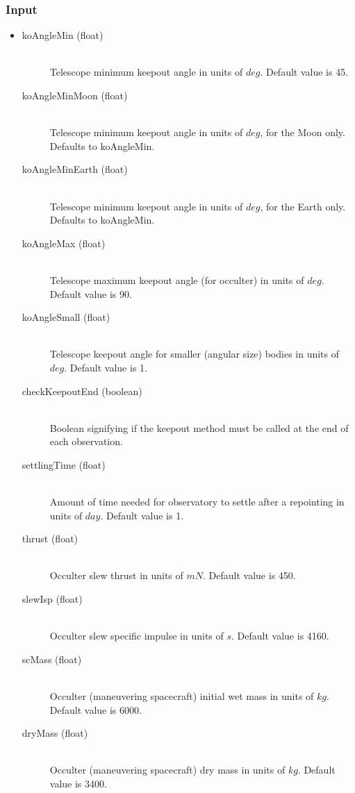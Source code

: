 \documentclass[cleanfoot]{asme2ej}
\begin{document}
\subsubsection*{Input}
\begin{itemize}
\item
\begin{description}
    \item[koAngleMin (float)] \hfill \\ Telescope minimum keepout angle in units of $deg$. Default value is 45.
    \item[koAngleMinMoon (float)] \hfill \\ Telescope minimum keepout angle in units of $deg$, for the Moon only. Defaults to koAngleMin.
    \item[koAngleMinEarth (float)] \hfill \\ Telescope minimum keepout angle in units of $deg$, for the Earth only. Defaults to koAngleMin.
    \item[koAngleMax (float)] \hfill \\ Telescope maximum keepout angle (for occulter) in units of $deg$. Default value is 90.
    \item[koAngleSmall (float)] \hfill \\ Telescope keepout angle for smaller (angular size) bodies in units of $deg$. Default value is 1.
    \item[checkKeepoutEnd (boolean)] \hfill \\ Boolean signifying if the keepout method must be called at the end of each observation.
    \item[settlingTime (float)] \hfill \\ Amount of time needed for observatory to settle after a repointing in units of $ day $. Default value is 1.
    \item[thrust (float)] \hfill \\ Occulter slew thrust in units of $ mN $. Default value is 450.
    \item[slewIsp (float)] \hfill \\ Occulter slew specific impulse in units of $ s $. Default value is 4160.
    \item[scMass (float)] \hfill \\ Occulter (maneuvering spacecraft) initial wet mass in units of $ kg $. Default value is 6000.
    \item[dryMass (float)] \hfill \\ Occulter (maneuvering spacecraft) dry mass in units of $ kg $. Default value is 3400.

\end{description}
\end{itemize}
\end{document}
